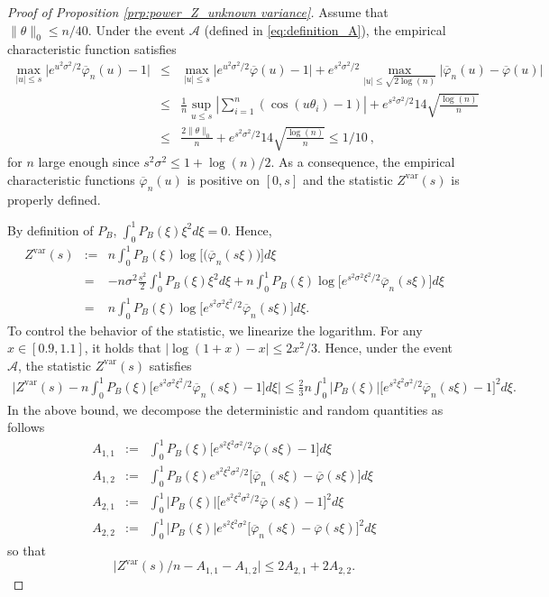 \documentclass[twoside,11pt]{article}
\def\beq{\begin{equation}}
\def\eeq{\end{equation}}
\def\beqn{\begin{eqnarray*}}
\def\eeqn{\end{eqnarray*}}
\def\cA{\mathcal{A}}
\newcommand{\<}{\langle}
\renewcommand{\>}{\rangle}
\begin{document}
 
 \begin{proof}[Proof of Proposition \ref{prp:power_Z_unknown variance}]
 

 Assume that $\|\theta\|_0\leq n/40$.
Under the event $\cA$ (defined in \eqref{eq:definition_A}), the  empirical characteristic function satisfies
\beqn
\max_{|u| \leq s} \big|e^{u^2\sigma^2/2}\overline{\varphi}_n(u)-1\big|&\leq& \max_{|u| \leq s} \big|e^{u^2\sigma^2/2}\overline{\varphi}(u)-1\big|+ e^{s^2\sigma^2/2}\max_{|u| \leq \sqrt{2\log(n)}}\big|\overline{\varphi}_n(u)-\overline{\varphi}(u)\big|\\
&\leq & \frac{1}{n}\sup_{u\leq s}|\sum_{i=1}^n (\cos(u\theta_i)-1)|  + e^{s^2\sigma^2/2} 14\sqrt{\frac{\log(n)}{n}} \\
&\leq & \frac{2\|\theta\|_0}{n}+ e^{s^2\sigma^2/2} 14 \sqrt{\frac{\log(n)}{n}}\leq 1/10\ ,
\eeqn
for $n$ large enough since $s^2\sigma^2 \leq 1+\log(n)/2$. As a consequence, the empirical characteristic functions  $\overline{\varphi}_n(u)$ is positive on $[0,s]$ and the statistic $Z^{\mathrm{var}}(s)$ is properly defined. 



By definition of $P_B$, $\int_0^1 P_B(\xi)\xi^2d\xi=0$. Hence,
\beqn
Z^{\mathrm{var}}(s)&:=&  n\int_0^1 P_B(\xi) \log\big[\big(\overline{\varphi}_n(s\xi)\big)\big]d\xi\\
& = &  - n \sigma^2 \frac{s^2}{2} \int_0^1 P_B(\xi)\xi^2 d\xi  +  n \int_0^1 P_B(\xi) \log\big[e^{s^2\sigma^2\xi^2/2}\overline{\varphi}_n(s\xi)\big]d\xi\\
& = &   n \int_0^1 P_B(\xi) \log\big[e^{s^2\sigma^2\xi^2/2}\overline{\varphi}_n(s\xi)\big]d\xi .
\eeqn
To control the behavior of the statistic, we linearize the logarithm. For any $x\in [0.9,1.1]$, it holds that $|\log(1+x)-x|\leq 2x^2/3$. Hence, under the event $\cA$, the statistic $Z^{\mathrm{var}}(s)$ satisfies
 \beqn 
\Big|Z^{\mathrm{var}}(s) - n\int_{0}^{1} P_B(\xi) \big[e^{s^2\sigma^2\xi^2/2}\overline{\varphi}_n(s\xi)-1 \big]d\xi \Big| \leq \frac{2}{3} n \int_{0}^{1} |P_B(\xi)| \big[e^{s^2\xi^2\sigma^2/2}\overline{\varphi}_n(s\xi)-1 \big]^2 d\xi.
\eeqn
In the above bound, we decompose the deterministic and random quantities as follows
\beqn
A_{1,1}&:=&  \int_0^1 P_B(\xi)  \big[e^{s^2\xi^2\sigma^2/2}\overline{\varphi}(s\xi)- 1\big]d\xi\\
A_{1,2}&:=&  \int_0^1 P_B(\xi)  e^{s^2\xi^2\sigma^2/2}\big[\overline{\varphi}_n(s\xi)- \overline{\varphi}(s\xi) \big]d\xi\\
A_{2,1}&:=&  \int_0^1|P_B(\xi)| \big[e^{s^2\xi^2\sigma^2/2}\overline{\varphi}(s\xi)- 1\big]^2d\xi\\
A_{2,2}&:=&  \int_0^1|P_B(\xi)| e^{s^2\xi^2\sigma^2}\big[\overline{\varphi}_n(s\xi)- \overline{\varphi}(s\xi) \big]^2d\xi
\eeqn
so that 
\beq \label{eq:decomposition_Z_A}
\Big|Z^{\mathrm{var}}(s)/n - A_{1,1}-A_{1,2}\Big|\leq  2A_{2,1} +2 A_{2,2}.
\eeq
 

\end{proof}
\end{document}

